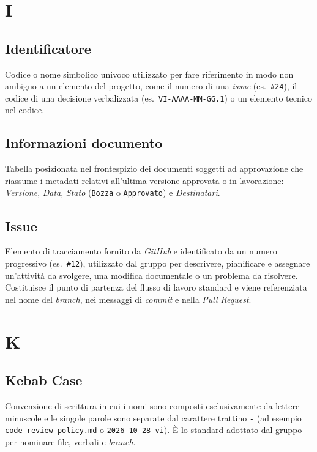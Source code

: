 \documentclass[11pt, a4paper]{article}
\begin{document}
\newpage

\section*{I}

\subsection*{Identificatore}
Codice o nome simbolico univoco utilizzato per fare riferimento in modo non ambiguo a un elemento del progetto, come il numero di una \textit{issue} (es.\ \texttt{\#24}), il codice di una decisione verbalizzata (es.\ \texttt{VI-AAAA-MM-GG.1}) o un elemento tecnico nel codice.

\subsection*{Informazioni documento}
Tabella posizionata nel frontespizio dei documenti soggetti ad approvazione che riassume i metadati relativi all'ultima versione approvata o in lavorazione: \textit{Versione}, \textit{Data}, \textit{Stato} (\texttt{Bozza} o \texttt{Approvato}) e \textit{Destinatari}.

\subsection*{Issue}
Elemento di tracciamento fornito da \textit{GitHub} e identificato da un numero progressivo (es.\ \texttt{\#12}), utilizzato dal gruppo per descrivere, pianificare e assegnare un'attività da svolgere, una modifica documentale o un problema da risolvere. Costituisce il punto di partenza del flusso di lavoro standard e viene referenziata nel nome del \textit{branch}, nei messaggi di \textit{commit} e nella \textit{Pull Request}.

\section*{K}

\subsection*{Kebab Case}
Convenzione di scrittura in cui i nomi sono composti esclusivamente da lettere minuscole e le singole parole sono separate dal carattere trattino \texttt{-} (ad esempio \texttt{code-review-policy.md} o \texttt{2026-10-28-vi}). È lo standard adottato dal gruppo per nominare file, verbali e \textit{branch}.
\end{document}
